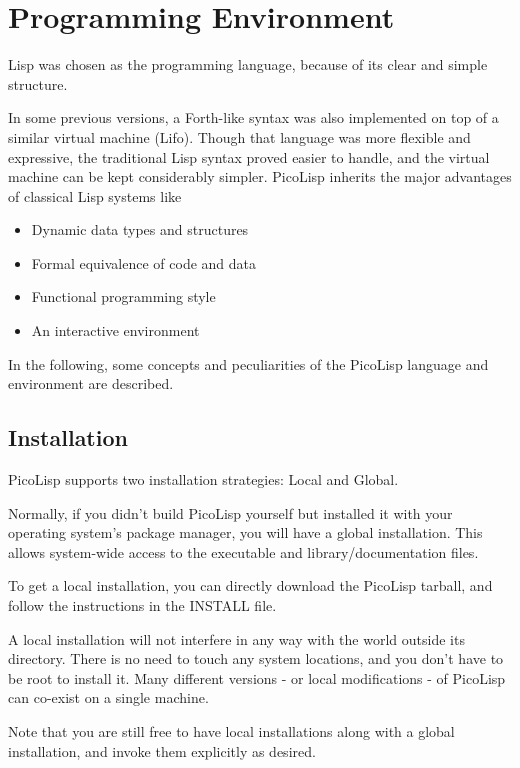  
\section{Programming Environment}
\label{sec:refm-programming-environment}


Lisp was chosen as the programming language, because of its clear and
simple structure.

In some previous versions, a Forth-like syntax was also implemented on
top of a similar virtual machine (Lifo). Though that language was more
flexible and expressive, the traditional Lisp syntax proved easier to
handle, and the virtual machine can be kept considerably simpler.
PicoLisp inherits the major advantages of classical Lisp systems like

\begin{itemize}
\item Dynamic data types and structures
\item Formal equivalence of code and data
\item Functional programming style
\item An interactive environment
\end{itemize}

In the following, some concepts and peculiarities of the PicoLisp
language and environment are described.

 

 
\subsection{Installation}
\label{sec:refm-installation}


PicoLisp supports two installation strategies: Local and Global.

Normally, if you didn't build PicoLisp yourself but installed it with
your operating system's package manager, you will have a global
installation. This allows system-wide access to the executable and
library/documentation files.

To get a local installation, you can directly download the PicoLisp
tarball, and follow the instructions in the INSTALL file.

A local installation will not interfere in any way with the world
outside its directory. There is no need to touch any system locations,
and you don't have to be root to install it. Many different versions -
or local modifications - of PicoLisp can co-exist on a single machine.

Note that you are still free to have local installations along with a
global installation, and invoke them explicitly as desired.

